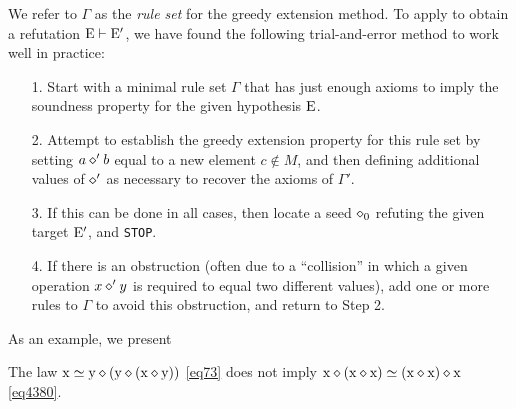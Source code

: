 We refer to $\Gamma$ as the \emph{rule set} for the greedy extension method. To apply  to obtain a refutation $\mathrm{E} \vdash {\mathrm{E}'}$, we have found the following trial-and-error method to work well in practice:
\begin{itemize}
\item[1.] Start with a minimal rule set $\Gamma$ that has just enough axioms to imply the soundness property for the given hypothesis $\mathrm{E}$.
\item[2.] Attempt to establish the greedy extension property for this rule set by setting $a \diamond' b$ equal to a new element $c \not \in M$, and then defining additional values of $\diamond'$ as necessary to recover the axioms of $\Gamma'$.
\item[3.]  If this can be done in all cases, then locate a seed $\diamond_0$ refuting the given target ${\mathrm{E}'}$, and \texttt{STOP}.
\item[4.]  If there is an obstruction (often due to a ``collision'' in which a given operation $x \diamond' y$ is required to equal two different values), add one or more rules to $\Gamma$ to avoid this obstruction, and return to Step 2.
\end{itemize}

As an example, we present

\begin{proposition}\label{73-4380} The law $\mathrm{x} \simeq \mathrm{y} \diamond (\mathrm{y} \diamond (\mathrm{x} \diamond \mathrm{y}))$ \eqref{eq73} does not imply $\mathrm{x} \diamond (\mathrm{x} \diamond \mathrm{x}) \simeq (\mathrm{x} \diamond \mathrm{x}) \diamond \mathrm{x}$ \eqref{eq4380}.
\end{proposition}

